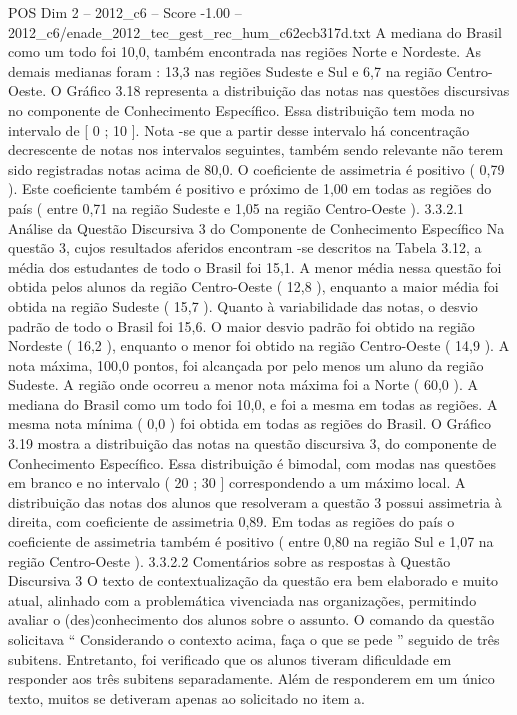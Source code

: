 \begin{textsample}{POS Dim 2 – 2012\_c6 – Score -1.00 – 2012\_c6/enade\_2012\_tec\_gest\_rec\_hum\_c62ecb317d.txt}
A mediana do Brasil como um todo foi 10,0, também encontrada nas regiões Norte e Nordeste.
As demais medianas foram : 13,3 nas regiões Sudeste e Sul e 6,7 na região Centro-Oeste.
O Gráfico 3.18 representa a distribuição das notas nas questões discursivas no componente de Conhecimento Específico.
Essa distribuição tem moda no intervalo de [ 0 ; 10 ].
Nota -se que a partir desse intervalo há concentração decrescente de notas nos intervalos seguintes, também sendo relevante não terem sido registradas notas acima de 80,0.
O coeficiente de assimetria é positivo ( 0,79 ).
Este coeficiente também é positivo e próximo de 1,00 em todas as regiões do país ( entre 0,71 na região Sudeste e 1,05 na região Centro-Oeste ). 3.3.2.1 Análise da Questão Discursiva 3 do Componente de Conhecimento Específico Na questão 3, cujos resultados aferidos encontram -se descritos na Tabela 3.12, a média dos estudantes de todo o Brasil foi 15,1.
A menor média nessa questão foi obtida pelos alunos da região Centro-Oeste ( 12,8 ), enquanto a maior média foi obtida na região Sudeste ( 15,7 ).
Quanto à variabilidade das notas, o desvio padrão de todo o Brasil foi 15,6.
O maior desvio padrão foi obtido na região Nordeste ( 16,2 ), enquanto o menor foi obtido na região Centro-Oeste ( 14,9 ).
A nota máxima, 100,0 pontos, foi alcançada por pelo menos um aluno da região Sudeste.
A região onde ocorreu a menor nota máxima foi a Norte ( 60,0 ).
A mediana do Brasil como um todo foi 10,0, e foi a mesma em todas as regiões.
A mesma nota mínima ( 0,0 ) foi obtida em todas as regiões do Brasil.
O Gráfico 3.19 mostra a distribuição das notas na questão discursiva 3, do componente de Conhecimento Específico.
Essa distribuição é bimodal, com modas nas questões em branco e no intervalo ( 20 ; 30 ] correspondendo a um máximo local.
A distribuição das notas dos alunos que resolveram a questão 3 possui assimetria à direita, com coeficiente de assimetria 0,89.
Em todas as regiões do país o coeficiente de assimetria também é positivo ( entre 0,80 na região Sul e 1,07 na região Centro-Oeste ). 3.3.2.2 Comentários sobre as respostas à Questão Discursiva 3 O texto de contextualização da questão era bem elaborado e muito atual, alinhado com a problemática vivenciada nas organizações, permitindo avaliar o (des)conhecimento dos alunos sobre o assunto.
O comando da questão solicitava “ Considerando o contexto acima, faça o que se pede ” seguido de três subitens.
Entretanto, foi verificado que os alunos tiveram dificuldade em responder aos três subitens separadamente.
Além de responderem em um único texto, muitos se detiveram apenas ao solicitado no item a.

\end{textsample}
